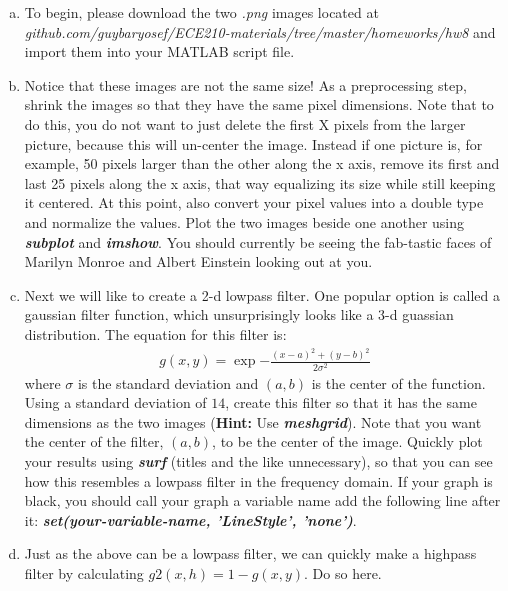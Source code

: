 \documentclass[11pt]{article}
\begin{document}
\begin{enumerate}[a.]
    \item To begin, please download the two \textit{.png} images located at
    \textit{github.com/guybaryosef/ECE210-materials/tree/master/homeworks/hw8}
    and import them into your MATLAB script file.

    \item Notice that these images are not the same size!
    As a preprocessing step, shrink the images so that they have the same
    pixel dimensions.
    Note that to do this, you do not want to just delete the first X pixels 
    from the larger picture, because this will un-center the image.
    Instead if one picture is, for example, 50 pixels larger than the other
    along the x axis, remove its first and last 25 pixels along the x axis,
    that way equalizing its size while still keeping it centered.
    At this point, also convert your pixel values into a double type and 
    normalize the values.
    Plot the two images beside one another using \textit{\textbf{subplot}}
    and \textit{\textbf{imshow}}.
    You should currently be seeing the fab-tastic faces of Marilyn Monroe and
    Albert Einstein looking out at you.

    \item Next we will like to create a 2-d lowpass filter.
    One popular option is called a gaussian filter function,
    which unsurprisingly looks like a 3-d guassian distribution.
    The equation for this filter is:
    \begin{align*}
        g(x,y) = \exp{-\frac{(x-a)^2 +(y-b)^2}{2\sigma^2}}
    \end{align*}
    where $\sigma$ is the standard deviation and $(a,b)$ is the center of the function.
    Using a standard deviation of $14$,
    create this filter so that it has the same dimensions as the two images
    (\textbf{Hint:} Use \textbf{\textit{meshgrid}}).
    Note that you want the center of the filter, $(a,b)$, to be the center of the image.
    Quickly plot your results using \textbf{\textit{surf}} (titles and the like unnecessary),
    so that you can see how this resembles a lowpass filter in the frequency domain.
    If your graph is black, you should call your graph a variable name add
    the following line after it:
    \textbf{\textit{set(your-variable-name, 'LineStyle', 'none')}}.

    \item Just as the above can be a lowpass filter, we can quickly make
    a highpass filter by calculating $g2(x,h) = 1 - g(x,y)$.
    Do so here.


\end{enumerate}
\end{document}
